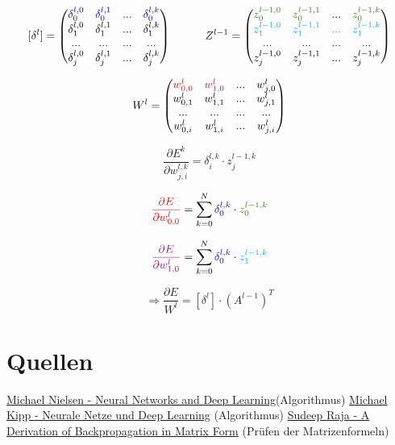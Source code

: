 \documentclass{article}
\begin{document}
 \[ [\delta^l] =
 \begin{pmatrix}
    \textcolor{blue}{\delta_0^{l,0}} & \textcolor{blue}{\delta_0^{l,1}} & \textcolor{blue}{...} & \textcolor{blue}{\delta_0^{l,k}} \\
    \delta_1^{l,0} & \delta_1^{l,1} & ... & \delta_1^{l,k} \\
    ... & ... & ... & ... \\
    \delta_j^{l,0} & \delta_j^{l,1} & ... & \delta_j^{l,k} \\
 \end{pmatrix} 
 \kern 30pt
 Z^{l-1} = 
 \begin{pmatrix}
    \textcolor{OliveGreen}{z_0^{l-1,0}} & \textcolor{OliveGreen}{z_0^{l-1,1}} & ... & \textcolor{OliveGreen}{z_0^{l-1,k}} \\
    \textcolor{Cyan}{z_1^{l-1,0}} & \textcolor{Cyan}{z_1^{l-1,1}} & \textcolor{Cyan}{...} & \textcolor{Cyan}{z_1^{l-1,k}} \\
    ... & ... & ... & ... \\
    z_j^{l-1,0} & z_j^{l-1,1} & ... & z_j^{l-1,k} \\
 \end{pmatrix} \]

\[ W^l = \begin{pmatrix}
    \textcolor{red}{w_{0,0}^l} & \textcolor{Plum}{w_{1,0}^l} & ... & w_{j,0}^l \\
    w_{0,1}^l & w_{1,1}^l & ... & w_{j,1}^l \\
    ... & ... & ... & ... \\
    w_{0,i}^l & w_{1,i}^l & ... & w_{j,i}^l
\end{pmatrix} \]



 \[ \frac{\partial E^k}{\partial w_{j,i}^{l,k}} = \delta_i^{l,k} \cdot z_j^{l-1,k} \]

 \[ \textcolor{red}{\frac{\partial E}{\partial w_{0,0}^l}} = 
 \sum_{k = 0}^{N} \textcolor{blue}{\delta_0^{l,k}} \cdot \textcolor{OliveGreen}{z_0^{l-1,k}} \]

  \[ \textcolor{Plum}{\frac{\partial E}{\partial w_{1,0}^l}} = 
 \sum_{k = 0}^{N} \textcolor{blue}{\delta_0^{l,k}} \cdot \textcolor{Cyan}{z_1^{l-1,k}} \]

\[ \Rightarrow \frac{\partial E}{W^l} = [\delta^l] \cdot (A^{l-1})^T \]


\section{Quellen}
\href{http://neuralnetworksanddeeplearning.com}{Michael Nielsen - Neural Networks and Deep Learning}(Algorithmus) \linebreak
\href{https://michaelkipp.de/deeplearning}{Michael Kipp - Neurale Netze und Deep Learning} (Algorithmus) \linebreak
\href{https://sudeepraja.github.io/Neural/}{Sudeep Raja - A Derivation of Backpropagation in Matrix Form} (Prüfen der Matrizenformeln)
\end{document}
